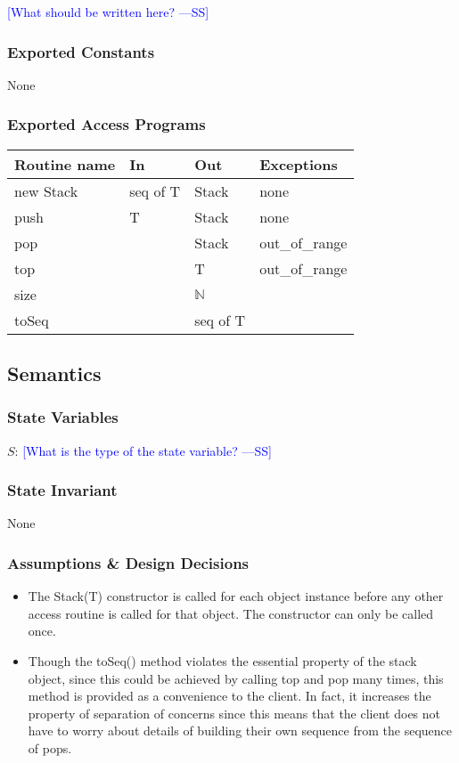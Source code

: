 \documentclass[12pt]{article}
\newcommand{\authornote}[3]{\textcolor{#1}{[#3 ---#2]}}
\newcommand{\authornote}[3]{}
\newcommand{\wss}[1]{\authornote{blue}{SS}{#1}}
\begin{document}
\wss{What should be written here?}

\subsubsection* {Exported Constants}

None

\subsubsection* {Exported Access Programs}

\begin{tabular}{| l | l | l | p{5cm} |}
\hline
\textbf{Routine name} & \textbf{In} & \textbf{Out} & \textbf{Exceptions}\\
\hline
new Stack & seq of T & Stack & none\\
\hline
push & T & Stack & none\\
\hline
pop & & Stack & out\_of\_range\\
\hline
top & & T & out\_of\_range\\
\hline
size & & $\mathbb{N}$ & \\
\hline
toSeq& & seq of T & \\
\hline
\end{tabular}

\subsection* {Semantics}

\subsubsection* {State Variables}

$S$: \wss{What is the type of the state variable?}

\subsubsection* {State Invariant}

None

\subsubsection* {Assumptions \& Design Decisions}

\begin{itemize}
\item The Stack(T) constructor is called for each object instance before any
  other access routine is called for that object.  The constructor can only be
  called once.
\item Though the toSeq() method violates the essential property of the stack
  object, since this could be achieved by calling top and pop many times, this
  method is provided as a convenience to the client. In fact, it increases the
  property of separation of concerns since this means that the client does not
  have to worry about details of building their own sequence from the sequence
  of pops.
\end{itemize}
\end{document}
